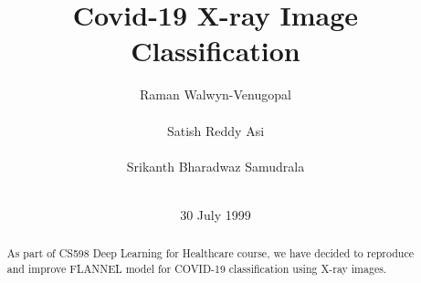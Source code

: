 \documentclass{sigkddExp}
\begin{document}
%

\title{Covid-19 X-ray Image Classification}
%

%


\author{
%
\alignauthor Raman Walwyn-Venugopal\\
\\
\alignauthor Satish Reddy Asi\\
\\
\alignauthor Srikanth Bharadwaz Samudrala\\
\\
}
\date{30 July 1999}
\maketitle
\begin{abstract}
    As part of CS598 Deep Learning for Healthcare course, we have decided to
    reproduce and improve FLANNEL model for COVID-19 classification using
    X-ray images.
\end{abstract}
\end{document}
